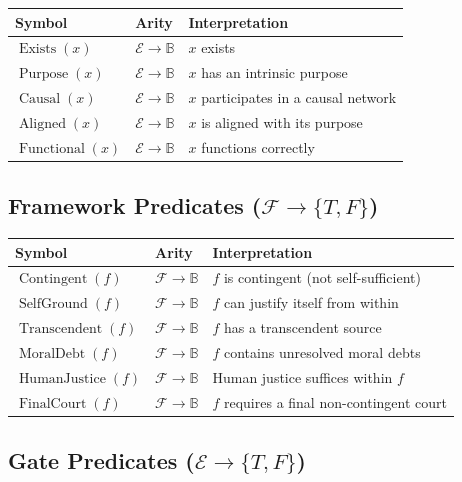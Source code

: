 \documentclass[11pt,a4paper]{article}
\theoremstyle{definition}
\newcommand{\E}{\mathcal{E}}      %
\newcommand{\F}{\mathcal{F}}      %
\newcommand{\Exists}{\operatorname{Exists}}
\newcommand{\Purpose}{\operatorname{Purpose}}
\newcommand{\Causal}{\operatorname{Causal}}
\newcommand{\Aligned}{\operatorname{Aligned}}
\newcommand{\Functional}{\operatorname{Functional}}
\newcommand{\Contingent}{\operatorname{Contingent}}
\newcommand{\SelfGround}{\operatorname{SelfGround}}
\newcommand{\Transcendent}{\operatorname{Transcendent}}
\newcommand{\MoralDebt}{\operatorname{MoralDebt}}
\newcommand{\HumanJustice}{\operatorname{HumanJustice}}
\newcommand{\FinalCourt}{\operatorname{FinalCourt}}
\begin{document}
\begin{center}
\begin{tabular}{@{} l l p{8cm} @{}}
\toprule
\textbf{Symbol} & \textbf{Arity} & \textbf{Interpretation} \\
\midrule
$\Exists(x)$       & $\E \to \mathbb{B}$ & $x$ exists \\
$\Purpose(x)$      & $\E \to \mathbb{B}$ & $x$ has an intrinsic purpose \\
$\Causal(x)$       & $\E \to \mathbb{B}$ & $x$ participates in a causal network \\
$\Aligned(x)$      & $\E \to \mathbb{B}$ & $x$ is aligned with its purpose \\
$\Functional(x)$   & $\E \to \mathbb{B}$ & $x$ functions correctly \\
\bottomrule
\end{tabular}
\end{center}

\subsection{Framework Predicates ($\F \to \{T, F\}$)}

\begin{center}
\begin{tabular}{@{} l l p{8cm} @{}}
\toprule
\textbf{Symbol} & \textbf{Arity} & \textbf{Interpretation} \\
\midrule
$\Contingent(f)$      & $\F \to \mathbb{B}$ & $f$ is contingent (not self-sufficient) \\
$\SelfGround(f)$      & $\F \to \mathbb{B}$ & $f$ can justify itself from within \\
$\Transcendent(f)$    & $\F \to \mathbb{B}$ & $f$ has a transcendent source \\
$\MoralDebt(f)$       & $\F \to \mathbb{B}$ & $f$ contains unresolved moral debts \\
$\HumanJustice(f)$    & $\F \to \mathbb{B}$ & Human justice suffices within $f$ \\
$\FinalCourt(f)$      & $\F \to \mathbb{B}$ & $f$ requires a final non-contingent court \\
\bottomrule
\end{tabular}
\end{center}

\subsection{Gate Predicates ($\E \to \{T, F\}$)}
\end{document}
